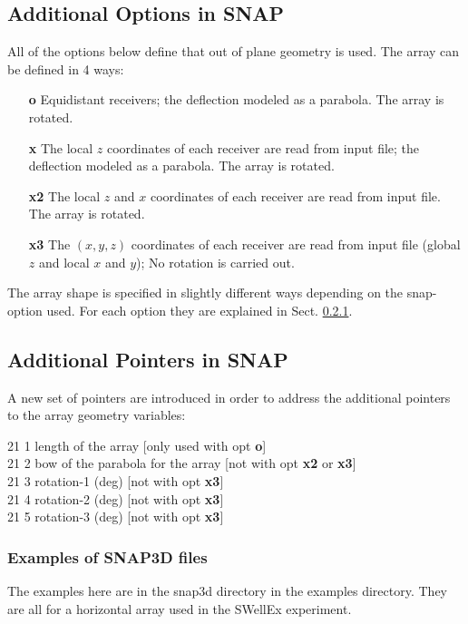 \documentclass{saclantc}
\begin{document}
\subsection{Additional Options in SNAP}
All of the options below define that out of plane geometry is used.
The array can be defined in 4 ways:
\begin{itemize}
\item[\bf o] Equidistant receivers; the deflection modeled as a
parabola. The array is rotated.
\item[\bf x] The  local $z$ coordinates of each receiver are read from input file; the deflection modeled as a parabola.  The array is rotated.
\item[\bf x2] The  local $z$ and $x$ coordinates of each receiver are read
from input file. The array is rotated.
\item[\bf x3]  The $(x,y,z)$ coordinates of each receiver are read
from input file (global $z$ and local $x$ and $y$); No rotation is carried out.
\end{itemize}

The array shape is specified in slightly different ways depending on
the snap-option used. For each option they are explained in Sect. \ref{se:snap3dex}.


\subsection{Additional Pointers in SNAP}
A new set of pointers are introduced in order to address the additional
pointers to the array geometry variables:

21  1 \hspace{1cm}   length of the array [only used with opt {\bf o}]\\
21  2 \hspace{1cm}   bow of the parabola for the array [not with opt
{\bf x2} or {\bf x3}]\\
21  3  \hspace{1cm}  rotation-1 (deg) [not with opt {\bf x3}]\\
21  4  \hspace{1cm}  rotation-2 (deg) [not with opt {\bf x3}]\\
21  5  \hspace{1cm}  rotation-3 (deg) [not with opt {\bf x3}]

\subsubsection{Examples of SNAP3D files}
\label{se:snap3dex}
The examples here are in the snap3d directory in the examples
directory.
They are all for a horizontal array used in the SWellEx experiment.
\end{document}

